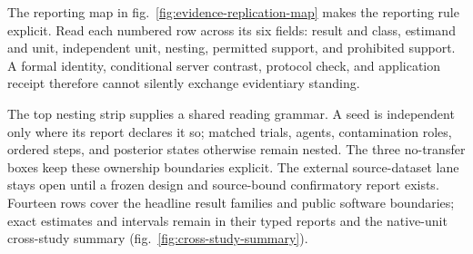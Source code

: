 \documentclass[
  english,
]{article}
\theoremstyle{plain}
\theoremstyle{definition}
\theoremstyle{remark}
\theoremstyle{definition}
\begin{document}
The reporting map in fig.~\ref{fig:evidence-replication-map} makes the
reporting rule explicit. Read each numbered row across its six fields:
result and class, estimand and unit, independent unit, nesting,
permitted support, and prohibited support. A formal identity,
conditional server contrast, protocol check, and application receipt
therefore cannot silently exchange evidentiary standing.

The top nesting strip supplies a shared reading grammar. A seed is
independent only where its report declares it so; matched trials,
agents, contamination roles, ordered steps, and posterior states
otherwise remain nested. The three no-transfer boxes keep these
ownership boundaries explicit. The external source-dataset lane stays
open until a frozen design and source-bound confirmatory report exists.
Fourteen rows cover the headline result families and public software
boundaries; exact estimates and intervals remain in their typed reports
and the native-unit cross-study summary
(fig.~\ref{fig:cross-study-summary}).
\end{document}
